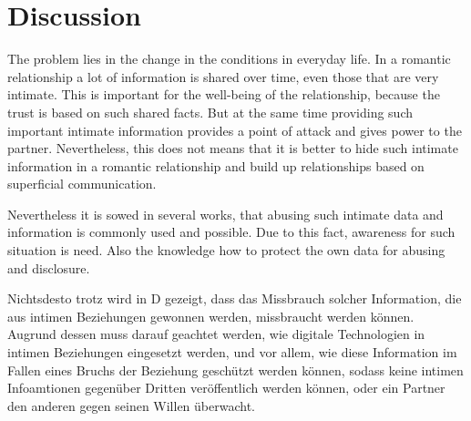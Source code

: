 \section{Discussion}
The problem lies in the change in the conditions in everyday life.
In a romantic relationship a lot of information is shared over time, even those that are very intimate. This is important for the well-being of the relationship, because the trust is based on such shared facts. But at the same time providing such important intimate information provides a point of attack and gives power to the partner. Nevertheless, this does not means that it is better to hide such intimate information in a romantic relationship and build up relationships based on superficial communication.

Nevertheless it is sowed in several works, that abusing such intimate data and information is commonly used and possible. Due to this fact, awareness for such situation is need. Also the knowledge how to protect the own data for abusing and disclosure.

Nichtsdesto trotz wird in D gezeigt, dass das Missbrauch solcher Information, die aus intimen Beziehungen gewonnen werden, missbraucht werden können. Augrund dessen muss darauf geachtet werden, wie digitale Technologien in intimen Beziehungen eingesetzt werden, und vor allem, wie diese Information im Fallen eines Bruchs der Beziehung geschützt werden können, sodass keine intimen Infoamtionen gegenüber Dritten veröffentlich werden können, oder ein Partner den anderen gegen seinen Willen überwacht.